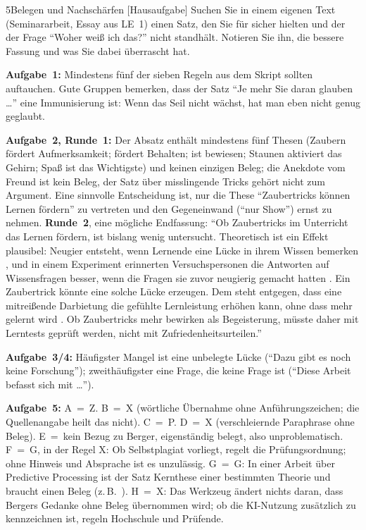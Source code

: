 \begin{uebungsblattb}{5}{Belegen und Nachschärfen}
[Hausaufgabe]
Suchen Sie in einem eigenen Text (Seminararbeit, Essay aus LE~1) einen
Satz, den Sie für sicher hielten und der der Frage \enquote{Woher weiß ich
das?} nicht standhält. Notieren Sie ihn, die bessere Fassung und was Sie
dabei überrascht hat.

\begin{lehrhinweis}[Erwartungshorizont]
\textbf{Aufgabe~1:} Mindestens fünf der sieben Regeln aus dem Skript
sollten auftauchen. Gute Gruppen bemerken, dass der Satz \enquote{Je mehr
Sie daran glauben \ldots} eine Immunisierung ist: Wenn das Seil nicht
wächst, hat man eben nicht genug geglaubt.

\textbf{Aufgabe~2, Runde~1:} Der Absatz enthält mindestens fünf Thesen
(Zaubern fördert Aufmerksamkeit; fördert Behalten; ist bewiesen; Staunen
aktiviert das Gehirn; Spaß ist das Wichtigste) und keinen einzigen Beleg;
die Anekdote vom Freund ist kein Beleg, der Satz über misslingende Tricks
gehört nicht zum Argument. Eine sinnvolle Entscheidung ist, nur die These
\enquote{Zaubertricks können Lernen fördern} zu vertreten und den
Gegeneinwand (\enquote{nur Show}) ernst zu nehmen. \textbf{Runde~2},
eine mögliche Endfassung:
\enquote{Ob Zaubertricks im Unterricht das Lernen fördern, ist bislang
wenig untersucht. Theoretisch ist ein Effekt plausibel: Neugier entsteht,
wenn Lernende eine Lücke in ihrem Wissen bemerken \parencite{loewenstein1994},
und in einem Experiment erinnerten Versuchspersonen die Antworten auf
Wissensfragen besser, wenn die Fragen sie zuvor neugierig gemacht hatten
\parencite{gruber2014}. Ein Zaubertrick könnte eine solche Lücke erzeugen.
Dem steht entgegen, dass eine mitreißende Darbietung die gefühlte
Lernleistung erhöhen kann, ohne dass mehr gelernt wird
\parencite{naftulin1973drfox,peerbabad2014drfox}. Ob Zaubertricks mehr
bewirken als Begeisterung, müsste daher mit Lerntests geprüft werden, nicht
mit Zufriedenheitsurteilen.}

\textbf{Aufgabe~3/4:} Häufigster Mangel ist eine unbelegte Lücke
(\enquote{Dazu gibt es noch keine Forschung}); zweithäufigster eine Frage,
die keine Frage ist (\enquote{Diese Arbeit befasst sich mit \ldots}).

\textbf{Aufgabe~5:} A~=~Z. B~=~X (wörtliche Übernahme ohne
Anführungszeichen; die Quellenangabe heilt das nicht). C~=~P. D~=~X
(verschleiernde Paraphrase ohne Beleg). E~=~kein Bezug zu Berger,
eigenständig belegt, also unproblematisch. F~=~G, in der Regel X: Ob
Selbstplagiat vorliegt, regelt die Prüfungsordnung; ohne Hinweis und
Absprache ist es unzulässig. G~=~G: In einer Arbeit über Predictive
Processing ist der Satz Kernthese einer bestimmten Theorie und braucht einen
Beleg (z.\,B.\ \textcite{clark2016}). H~=~X: Das Werkzeug ändert nichts
daran, dass Bergers Gedanke ohne Beleg übernommen wird; ob die
KI-Nutzung zusätzlich zu kennzeichnen ist, regeln Hochschule und Prüfende.
\end{lehrhinweis}
\end{uebungsblattb}
